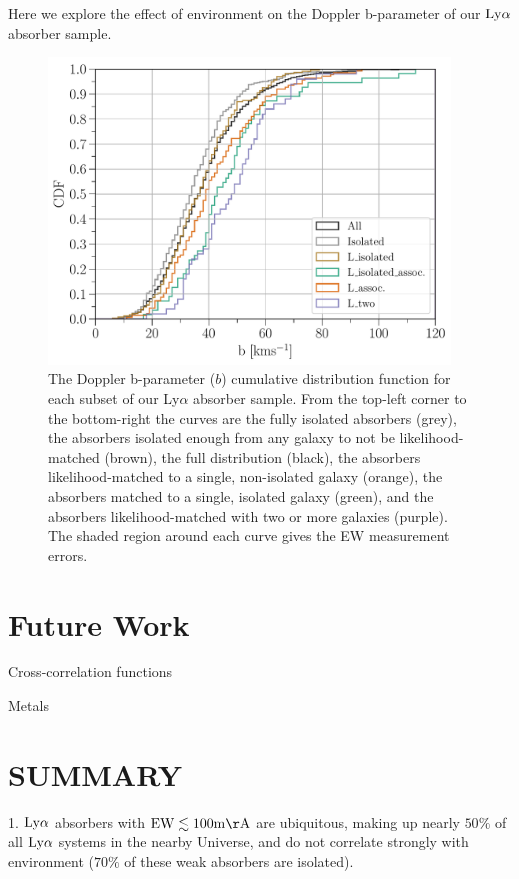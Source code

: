 \documentclass[twocolumn,tighten]{aastex62}
\begin{document}
Here we explore the effect of environment on the Doppler b-parameter of our $\rm Ly\alpha$ absorber sample.
\begin{figure}[ht!]
        \centering
        \vspace{0pt}
        \includegraphics[width=0.95\textwidth]{hist(b)_all6_bins1_6_min_maxEW_0_10000.pdf}
        \caption{\small{The Doppler b-parameter ($b$) cumulative distribution function for each subset of our Ly$\alpha$ absorber sample. From the top-left corner to the bottom-right the curves are the fully isolated absorbers (grey), the absorbers isolated enough from any galaxy to not be likelihood-matched (brown), the full distribution (black), the absorbers likelihood-matched to a single, non-isolated galaxy (orange), the absorbers matched to a single, isolated galaxy (green), and the absorbers likelihood-matched with two or more galaxies (purple). The shaded region around each curve gives the EW measurement errors.}}
        \vspace{-5pt}
        \label{cdf_b}
\end{figure}



\section{Future Work}

Cross-correlation functions \cite{chen2005}

Metals





\section{SUMMARY}
1. $\rm Ly\alpha$ absorbers with $\rm EW \lesssim 100 m\AA$ are ubiquitous, making up nearly $50\%$ of all $\rm Ly\alpha$ systems in the nearby Universe, and do not correlate strongly with environment ($70\%$ of these weak absorbers are isolated). 
\end{document}
